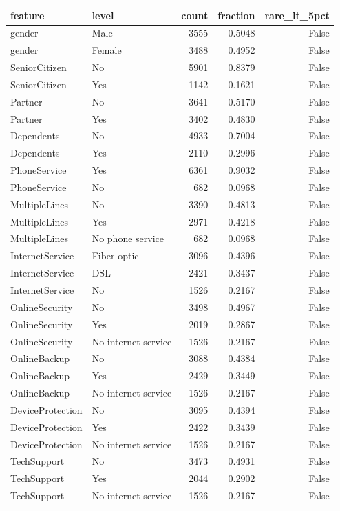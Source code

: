 \begin{tabular}{llrrr}
\toprule
feature & level & count & fraction & rare\_lt\_5pct \\
\midrule
gender & Male & 3555 & 0.5048 & False \\
gender & Female & 3488 & 0.4952 & False \\
SeniorCitizen & No & 5901 & 0.8379 & False \\
SeniorCitizen & Yes & 1142 & 0.1621 & False \\
Partner & No & 3641 & 0.5170 & False \\
Partner & Yes & 3402 & 0.4830 & False \\
Dependents & No & 4933 & 0.7004 & False \\
Dependents & Yes & 2110 & 0.2996 & False \\
PhoneService & Yes & 6361 & 0.9032 & False \\
PhoneService & No & 682 & 0.0968 & False \\
MultipleLines & No & 3390 & 0.4813 & False \\
MultipleLines & Yes & 2971 & 0.4218 & False \\
MultipleLines & No phone service & 682 & 0.0968 & False \\
InternetService & Fiber optic & 3096 & 0.4396 & False \\
InternetService & DSL & 2421 & 0.3437 & False \\
InternetService & No & 1526 & 0.2167 & False \\
OnlineSecurity & No & 3498 & 0.4967 & False \\
OnlineSecurity & Yes & 2019 & 0.2867 & False \\
OnlineSecurity & No internet service & 1526 & 0.2167 & False \\
OnlineBackup & No & 3088 & 0.4384 & False \\
OnlineBackup & Yes & 2429 & 0.3449 & False \\
OnlineBackup & No internet service & 1526 & 0.2167 & False \\
DeviceProtection & No & 3095 & 0.4394 & False \\
DeviceProtection & Yes & 2422 & 0.3439 & False \\
DeviceProtection & No internet service & 1526 & 0.2167 & False \\
TechSupport & No & 3473 & 0.4931 & False \\
TechSupport & Yes & 2044 & 0.2902 & False \\
TechSupport & No internet service & 1526 & 0.2167 & False \\

\end{tabular}
